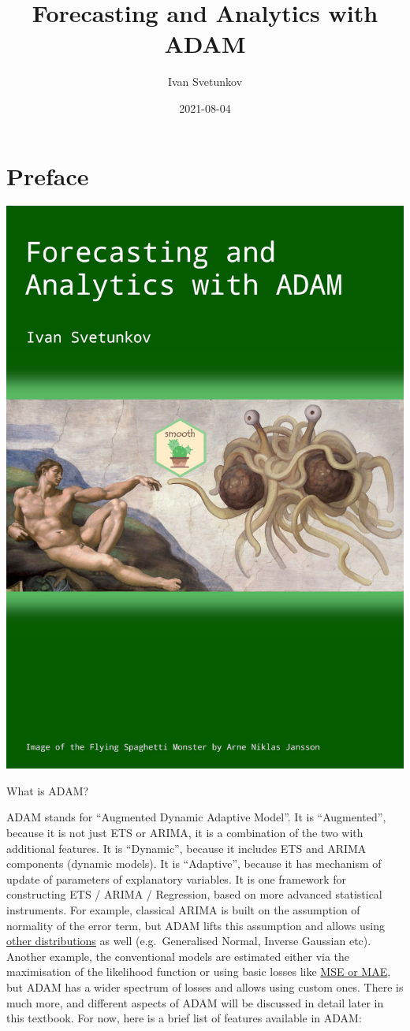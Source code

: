 \documentclass[
]{book}
\title{Forecasting and Analytics with ADAM}
\author{Ivan Svetunkov}
\date{2021-08-04}
\theoremstyle{definition}
\theoremstyle{definition}
\theoremstyle{definition}
\theoremstyle{definition}
\theoremstyle{remark}
\begin{document}
\maketitle

{
\setcounter{tocdepth}{1}
\tableofcontents
}
\hypertarget{preface}{%
\chapter*{Preface}\label{preface}}

\begin{center}\includegraphics[width=0.6\linewidth]{images/Adam-Title-web} \end{center}

What is ADAM?

ADAM stands for ``Augmented Dynamic Adaptive Model''. It is ``Augmented'', because it is not just ETS or ARIMA, it is a combination of the two with additional features. It is ``Dynamic'', because it includes ETS and ARIMA components (dynamic models). It is ``Adaptive'', because it has mechanism of update of parameters of explanatory variables. It is one framework for constructing ETS / ARIMA / Regression, based on more advanced statistical instruments. For example, classical ARIMA is built on the assumption of normality of the error term, but ADAM lifts this assumption and allows using \protect\hyperlink{distributions}{other distributions} as well (e.g.~Generalised Normal, Inverse Gaussian etc). Another example, the conventional models are estimated either via the maximisation of the likelihood function or using basic losses like \protect\hyperlink{errorMeasures}{MSE or MAE}, but ADAM has a wider spectrum of losses and allows using custom ones. There is much more, and different aspects of ADAM will be discussed in detail later in this textbook. For now, here is a brief list of features available in ADAM:
\end{document}
